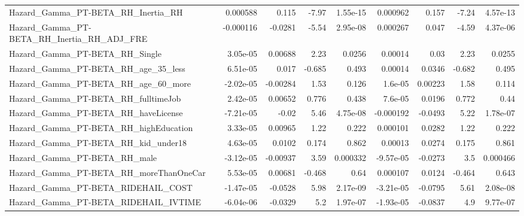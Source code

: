 \begin{tabular}{lrrrrrrrr}
Hazard\_Gamma\_PT-BETA\_RH\_Inertia\_RH                 &    0.000588 &        0.115 &    -7.97 & 1.55e-15 &   0.000962 &       0.157 &        -7.24 &      4.57e-13 \\
Hazard\_Gamma\_PT-BETA\_RH\_Inertia\_RH\_ADJ\_FRE         &   -0.000116 &      -0.0281 &    -5.54 & 2.95e-08 &   0.000267 &       0.047 &        -4.59 &      4.37e-06 \\
Hazard\_Gamma\_PT-BETA\_RH\_Single                     &    3.05e-05 &      0.00688 &     2.23 &   0.0256 &    0.00014 &        0.03 &         2.23 &        0.0255 \\
Hazard\_Gamma\_PT-BETA\_RH\_age\_35\_less                &    6.51e-05 &        0.017 &   -0.685 &    0.493 &    0.00014 &      0.0346 &       -0.682 &         0.495 \\
Hazard\_Gamma\_PT-BETA\_RH\_age\_60\_more                &   -2.02e-05 &     -0.00284 &     1.53 &    0.126 &    1.6e-05 &     0.00223 &         1.58 &         0.114 \\
Hazard\_Gamma\_PT-BETA\_RH\_fulltimeJob                &    2.42e-05 &      0.00652 &    0.776 &    0.438 &    7.6e-05 &      0.0196 &        0.772 &          0.44 \\
Hazard\_Gamma\_PT-BETA\_RH\_haveLicense                &   -7.21e-05 &        -0.02 &     5.46 & 4.75e-08 &  -0.000192 &     -0.0493 &         5.22 &      1.78e-07 \\
Hazard\_Gamma\_PT-BETA\_RH\_highEducation              &    3.33e-05 &      0.00965 &     1.22 &    0.222 &   0.000101 &      0.0282 &         1.22 &         0.222 \\
Hazard\_Gamma\_PT-BETA\_RH\_kid\_under18                &    4.63e-05 &       0.0102 &    0.174 &    0.862 &    0.00013 &      0.0274 &        0.175 &         0.861 \\
Hazard\_Gamma\_PT-BETA\_RH\_male                       &   -3.12e-05 &     -0.00937 &     3.59 & 0.000332 &  -9.57e-05 &     -0.0273 &          3.5 &      0.000466 \\
Hazard\_Gamma\_PT-BETA\_RH\_moreThanOneCar             &    5.53e-05 &      0.00681 &   -0.468 &     0.64 &   0.000107 &      0.0124 &       -0.464 &         0.643 \\
Hazard\_Gamma\_PT-BETA\_RIDEHAIL\_COST                 &   -1.47e-05 &      -0.0528 &     5.98 & 2.17e-09 &  -3.21e-05 &     -0.0795 &         5.61 &      2.08e-08 \\
Hazard\_Gamma\_PT-BETA\_RIDEHAIL\_IVTIME               &   -6.04e-06 &      -0.0329 &      5.2 & 1.97e-07 &  -1.93e-05 &     -0.0837 &          4.9 &      9.77e-07 \\

\end{tabular}
